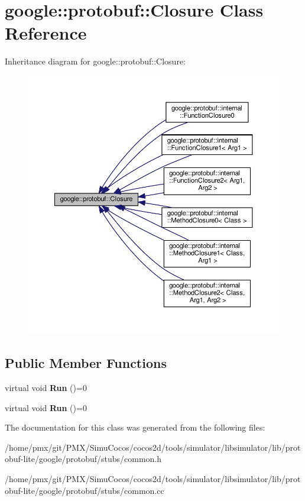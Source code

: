 \hypertarget{classgoogle_1_1protobuf_1_1Closure}{}\section{google\+:\+:protobuf\+:\+:Closure Class Reference}
\label{classgoogle_1_1protobuf_1_1Closure}


Inheritance diagram for google\+:\+:protobuf\+:\+:Closure\+:
\nopagebreak
\begin{figure}[H]
\begin{center}
\leavevmode
\includegraphics[width=350pt]{classgoogle_1_1protobuf_1_1Closure__inherit__graph}
\end{center}
\end{figure}
\subsection*{Public Member Functions}
\begin{DoxyCompactItemize}
\item 
\mbox{\label{classgoogle_1_1protobuf_1_1Closure_a2fd9b41dcfb3f77bbf2517dde662b5d3}} 
virtual void {\bfseries Run} ()=0
\item 
\mbox{\label{classgoogle_1_1protobuf_1_1Closure_a2fd9b41dcfb3f77bbf2517dde662b5d3}} 
virtual void {\bfseries Run} ()=0
\end{DoxyCompactItemize}


The documentation for this class was generated from the following files\+:\begin{DoxyCompactItemize}
\item 
/home/pmx/git/\+P\+M\+X/\+Simu\+Cocos/cocos2d/tools/simulator/libsimulator/lib/protobuf-\/lite/google/protobuf/stubs/common.\+h\item 
/home/pmx/git/\+P\+M\+X/\+Simu\+Cocos/cocos2d/tools/simulator/libsimulator/lib/protobuf-\/lite/google/protobuf/stubs/common.\+cc\end{DoxyCompactItemize}
